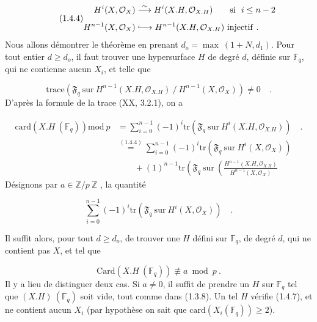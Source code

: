\begin{equation}\tag{1.4.4}
\begin{aligned} H^i(X,\mathcal{O}_X) &\stackrel{\sim}{\longrightarrow} H^i(X.H,\mathcal{O}_{X.H}) \qquad \mathrm{si}\ \ i \leq n - 2 \\[1ex] H^{n-1}(X,\mathcal{O}_X) &\lhook\joinrel\longrightarrow H^{n-1}(X.H,\mathcal{O}_{X.H})\ \mathrm{injectif}\ . \end{aligned}
\end{equation}
Nous allons démontrer le théorème en prenant $d_o = \max\ (1+N,d_1)$. Pour tout entier $d \geq d_o$, il faut trouver une hypersurface $H$ de degré $d$, définie sur $\mathbb{F}_q$, qui ne contienne aucun $X_i$, et telle que

\begin{equation}\tag{1.4.5}
\mathrm{trace}(\mathfrak{F}_q\ \mathrm{sur}\ H^{n-1}(X.H,\mathcal{O}_{X.H})\ /\ H^{n-1}(X,\mathcal{O}_X)) \neq 0 \quad .
\end{equation}
D'après la formule de la trace (XX, 3.2.1), on a

\begin{equation}\tag{1.4.6}
\begin{aligned}
\mathrm{card}(X.H\ (\mathbb{F}_q))\mathrm{mod}\ p
&= \sum_{i=0}^{n-1}(-1)^i
\mathrm{tr}(\mathfrak{F}_q\ \mathrm{sur}\ H^i(X.H,\mathcal{O}_{X.H})) \quad . \\
&\stackrel{(1.4.4)}{=} \sum_{i=0}^{n-1}(-1)^i
\mathrm{tr}(\mathfrak{F}_q\ \mathrm{sur}\ H^i(X,\mathcal{O}_X)) \\
&\qquad +(1)^{n-1}\mathrm{tr}\!\left(\mathfrak{F}_q\ \mathrm{sur}\
\left(\frac{H^{n-1}(X.H,\mathcal{O}_{X.H})}{H^{n-1}(X,\mathcal{O}_X)}\right.\right.
\end{aligned}
\end{equation}
Désignons par $a \in \mathbb{Z}/p\ \mathbb{Z}$ , la quantité

\begin{equation*}
\sum_{i=0}^{n-1} (-1)^i \mathrm{tr}(\mathfrak{F}_q\ \mathrm{sur}\ H^i(X,\mathcal{O}_X)) \quad .
\end{equation*}


Il suffit alors, pour tout $d \geq d_o$, de trouver une $H$ défini sur $\mathbb{F}_q$, de degré $d$, qui ne contient pas $X$, et tel que

\begin{equation}\tag{1.4.7}
\mathrm{Card}(X.H\ (\mathbb{F}_q)) \not\equiv a \bmod p \ .
\end{equation}
Il y a lieu de distinguer deux cas. Si $a \neq 0$, il suffit de prendre un $H$ sur $\mathbb{F}_q$ tel que $(X.H)\ (\mathbb{F}_q)$ soit vide, tout comme dans (1.3.8). Un tel $H$ vérifie (1.4.7), et ne contient aucun $X_i$ (par hypothèse on sait que $\mathrm{card}(X_i(\mathbb{F}_q)) \geq 2$).

